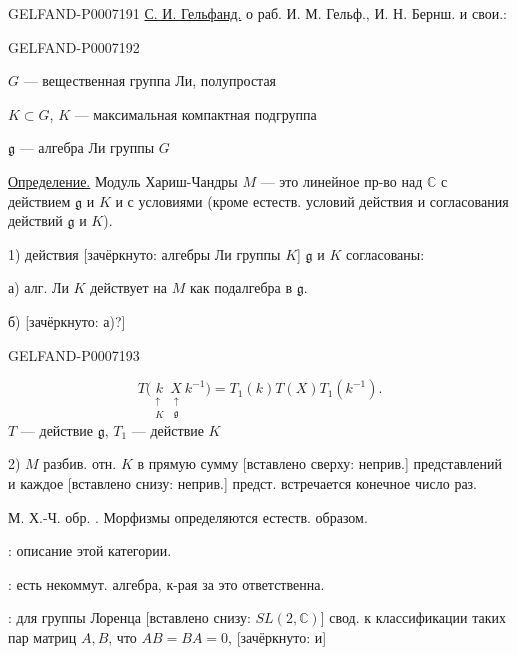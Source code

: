 \begin{GelfandAdjacentEvidence}{GELFAND-P000719}{1}
\underline{С. И. Гельфанд.} о раб. И. М. Гельф., И. Н. Бернш. и свои.:
\end{GelfandAdjacentEvidence}
\begin{GelfandAdjacentEvidence}{GELFAND-P000719}{2}


\begin{flushright}
\end{flushright}

\(G\) --- вещественная группа Ли, полупростая

\(K\subset G\), \(K\) --- максимальная компактная подгруппа

\(\mathfrak g\) --- алгебра Ли группы \(G\)

\underline{Определение.} Модуль Хариш-Чандры \(M\) ---
это линейное пр-во над \(\mathbb C\) с действием \(\mathfrak g\) и \(K\) и с условиями
(кроме естеств. условий действия и согласования действий \(\mathfrak g\) и \(K\)).

1) действия [зачёркнуто: алгебры Ли группы \(K\)] \(\mathfrak g\) и \(K\) согласованы:

а) алг. Ли \(K\) действует на \(M\) как подалгебра в \(\mathfrak g\).

б) [зачёркнуто: а)?]
\end{GelfandAdjacentEvidence}
\begin{GelfandAdjacentEvidence}{GELFAND-P000719}{3}

\[
T\bigl(\underset{\substack{\uparrow\\K}}{k}\,
\underset{\substack{\uparrow\\\mathfrak g}}{X}\,k^{-1}\bigr)
=T_1(k)T(X)T_1(k^{-1}).
\]
\(T\) --- действие \(\mathfrak g\), \(T_1\) --- действие \(K\)

2) \(M\) разбив. отн. \(K\) в прямую сумму [вставлено сверху: неприв.]
представлений и каждое [вставлено снизу: неприв.] предст. встречается конечное число раз.

М. Х.-Ч. обр. . Морфизмы определяются естеств. образом.

: описание этой категории.

: есть некоммут. алгебра, к-рая за это ответственна.

:
для группы Лоренца [вставлено снизу: \(SL(2,\mathbb C)\)] свод. к классификации таких пар матриц
\(A,B\), что \(AB=BA=0\),
[зачёркнуто: и]
\end{GelfandAdjacentEvidence}
